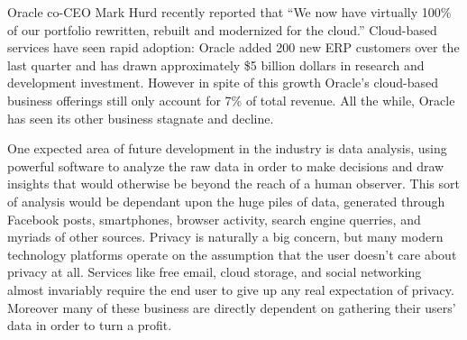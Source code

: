 Oracle co-CEO Mark Hurd recently reported that ``We now have virtually 100\% of our portfolio rewritten, rebuilt and modernized for the cloud.''\autocite[]{OracleRebuilt}
Cloud-based services have seen rapid adoption: Oracle added 200 new ERP customers over the last quarter and has drawn approximately \$5 billion dollars in research and development investment.\autocite[]{OracleRebuilt}
However in spite of this growth Oracle's cloud-based business offerings still only account for 7\% of total revenue.\autocite[]{OracleNoGrowth}
All the while, Oracle has seen its other business stagnate and decline.\autocite[]{OracleNoGrowth}

One expected area of future development in the industry is data analysis, using powerful software to analyze the raw data in order to make decisions and draw insights that would otherwise be beyond the reach of a human observer.\autocite[]{NextGenBusinessSoftware}
This sort of analysis would be dependant upon the huge piles of data, generated through Facebook posts, smartphones, browser activity, search engine querries, and myriads of other sources.\autocite[]{NextGenBusinessSoftware}
Privacy is naturally a big concern, but many modern technology platforms operate on the assumption that the user doesn't care about privacy at all.
Services like free email, cloud storage, and social networking almost invariably require the end user to give up any real expectation of privacy.
Moreover many of these business are directly dependent on gathering their users' data in order to turn a profit.\autocite[]{NextGenBusinessSoftware}
